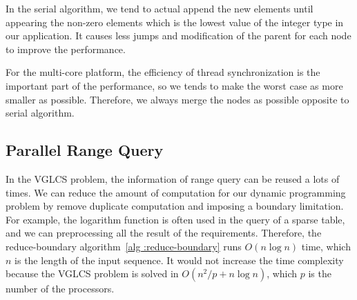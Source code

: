 In the serial algorithm, we tend to actual append the new elements until
appearing the non-zero elements which is the lowest value of the integer
type in our application.  It causes less jumps and modification of the
parent for each node to improve the performance.




For the multi-core platform, the efficiency of thread synchronization is
the important part of the performance, so we tends to make the worst
case as more smaller as possible.  Therefore, we always merge the nodes
as possible opposite to serial algorithm.


\iffalse
每個執行緒負責數個完整的并查集，操作時應偏向延遲標記操作，
儘早合併的策略易造成快取未中。由於動態規劃的傾向中，插入值的趨勢有兩種情況，
其一為連續不合定義的零元素插入，其二為遞增元素的插入，在這兩者穿插的趨勢中，
我們發現延遲操作將會帶來較能改善快取未中問題。
\fi

\subsection{Parallel Range Query}


In the VGLCS problem, the information of range query can be reused a
lots of times.  We can reduce the amount of computation for our dynamic
programming problem by remove duplicate computation and imposing a
boundary limitation.  For example, the logarithm function is often used
in the query of a sparse table, and we can preprocessing all the result
of the requirements.  Therefore, the reduce-boundary algorithm~\ref{alg
:reduce-boundary} runs $O(n \log n)$ time, which $n$  is the length of
the input sequence.  It would not increase the time complexity because
the VGLCS problem is solved in  $O(n^2 / p + n \log n)$, which $p$ is
the number of the processors.


\iffalse
運行區間查找時，一般依賴內建函數在 $O(1)$ 時間完成對數取整，
然而，在 VGLCS 這類型的動態規劃中，區間查找的對數結果是可以被預測的，預先將每一組詢問的區段對數結果儲存在陣列中，便可降低指令次數。
\fi

